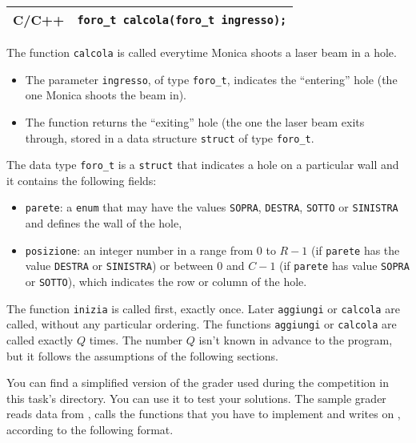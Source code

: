 \medskip

\begin{center}\begin{tabularx}{\textwidth}{|c|X|}
\hline
C/C++  & \verb|foro_t calcola(foro_t ingresso);|\\
\hline
\end{tabularx}\end{center}

The function \texttt{calcola} is called everytime Monica shoots a laser beam in a hole.
\begin{itemize}[nolistsep]
	\item The parameter \texttt{ingresso}, of type \texttt{foro\_t}, indicates the ``entering'' hole (the one Monica shoots the beam in).
	\item The function returns the ``exiting'' hole (the one the laser beam exits through, stored in a data structure \texttt{struct} of type \texttt{foro\_t}.
\end{itemize}
The data type \texttt{foro\_t} is a \texttt{struct} that indicates a hole on a particular wall and it contains the following fields:
\begin{itemize}
	\item \texttt{parete}:
      a \texttt{enum} that may have the values \texttt{SOPRA}, \texttt{DESTRA}, \texttt{SOTTO} or \texttt{SINISTRA} and defines the wall of the hole,
	\item \texttt{posizione}:
	    an integer number in a range from $0$ to $R-1$ (if \texttt{parete} has the value \texttt{DESTRA} or \texttt{SINISTRA}) or between $0$ and $C-1$ (if \texttt{parete} has value \texttt{SOPRA} or \texttt{SOTTO}), which indicates the row or column of the hole.
\end{itemize}

\medskip

The function \texttt{inizia} is called first, exactly once.
Later \texttt{aggiungi} or \texttt{calcola} are called, without any particular ordering.
The functions \texttt{aggiungi} or \texttt{calcola} are called exactly $Q$ times.
The number $Q$ isn't known in advance to the program, but it follows the assumptions of the following sections.



\Grader
You can find a simplified version of the grader used during the competition in this task's directory. You can use it to test your solutions. The sample grader reads data from , calls the functions that you have to implement and writes on \outputfile{}, according to the following format.

